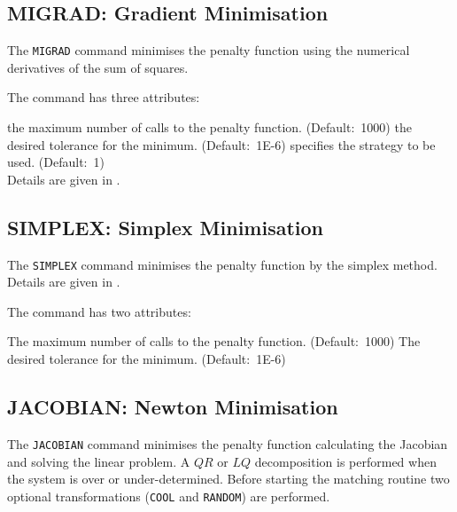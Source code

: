 \subsection{MIGRAD: Gradient Minimisation}
\label{subsec:match_migrad}
The {\tt MIGRAD} command minimises the penalty function using the numerical
derivatives of the sum of squares.  


The command has three attributes: 
\begin{madlist}
    the maximum number of calls to the penalty
   function. (Default:~1000) 
    the desired tolerance for the minimum. 
   (Default:~1E-6)
    specifies the strategy to be used. (Default:~1) \\
   Details are given in \cite{MINUIT}.  
\end{madlist} 

\subsection{SIMPLEX: Simplex Minimisation}
\label{subsec:match_simplex}
The {\tt SIMPLEX} command minimises the penalty function by the simplex
method. Details are given in \cite{MINUIT}.


The command has two attributes: 
\begin{madlist}
    The maximum number of calls to the penalty
   function. (Default:~1000) 
    The desired tolerance for the minimum. 
   (Default:~1E-6)
\end{madlist} 

\subsection{JACOBIAN: Newton Minimisation}
\label{subsec:match_jacobian}
The {\tt JACOBIAN} command minimises the penalty function calculating the
Jacobian and solving the linear problem. A $Q R$ or $L Q$  decomposition is
performed when the system is over or under-determined. Before starting
the matching routine two optional transformations ({\tt COOL} and {\tt RANDOM}) 
are performed. 


